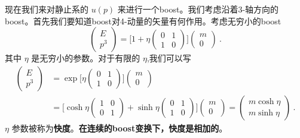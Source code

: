 现在我们来对静止系的 $u(p)$ 来进行一个boost。我们考虑沿着3-轴方向的boost。首先我们要知道boost对4-动量的矢量有何作用。考虑无穷小的boost
\begin{equation}
\begin{pmatrix}
E \\ p^3
\end{pmatrix} = \bigg[ 1 + \eta \begin{pmatrix}
0 & 1 \\
1 & 0 
\end{pmatrix} \bigg] \begin{pmatrix}
m \\ 0
\end{pmatrix}~.
\end{equation}
其中 $\eta$ 是无穷小的参数。对于有限的 $\eta$,我们可以写
\begin{align}\nonumber
\begin{pmatrix}
E \\ p^3
\end{pmatrix} & = \exp \bigg[ \eta \begin{pmatrix}
0 & 1 \\
1& 0
\end{pmatrix} \bigg]\begin{pmatrix}
m \\ 0
\end{pmatrix} \\
& = \bigg[ \cosh \eta \begin{pmatrix}
1 & 0 \\ 0 & 1
\end{pmatrix} + \sinh \eta \begin{pmatrix}
0 & 1 \\
1 & 0
\end{pmatrix}\bigg]\begin{pmatrix}
m \\ 0
\end{pmatrix} = \begin{pmatrix}
m \cosh \eta \\ m \sinh \eta
\end{pmatrix}~.
\end{align}
$\eta$ 参数被称为\textbf{快度}。\textbf{在连续的boost变换下，快度是相加的}。
